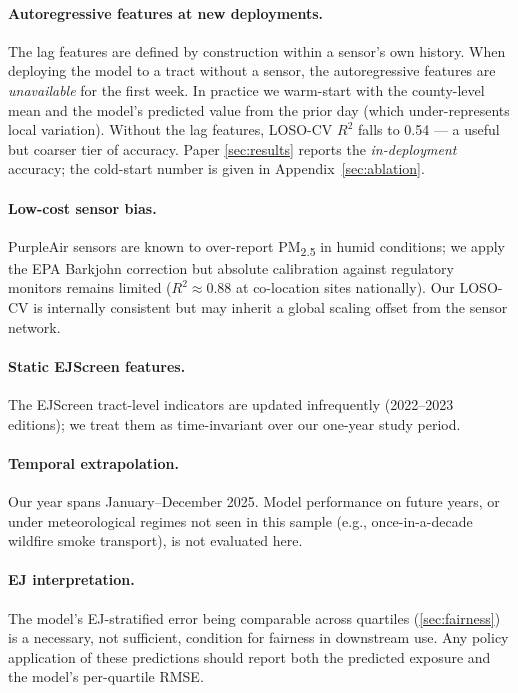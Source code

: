 \documentclass{article}
\begin{document}
\paragraph{Autoregressive features at new deployments.} The lag features are defined by construction within a sensor's own history. When deploying the model to a tract without a sensor, the autoregressive features are \emph{unavailable} for the first week. In practice we warm-start with the county-level mean and the model's predicted value from the prior day (which under-represents local variation). Without the lag features, LOSO-CV $R^2$ falls to 0.54 --- a useful but coarser tier of accuracy. Paper \autoref{sec:results} reports the \emph{in-deployment} accuracy; the cold-start number is given in Appendix~\ref{sec:ablation}.

\paragraph{Low-cost sensor bias.} PurpleAir sensors are known to over-report PM\textsubscript{2.5} in humid conditions; we apply the EPA Barkjohn correction \citep{barkjohn2021} but absolute calibration against regulatory monitors remains limited ($R^2 \approx 0.88$ at co-location sites nationally). Our LOSO-CV is internally consistent but may inherit a global scaling offset from the sensor network.

\paragraph{Static EJScreen features.} The EJScreen tract-level indicators are updated infrequently (\num{2022}--\num{2023} editions); we treat them as time-invariant over our one-year study period.

\paragraph{Temporal extrapolation.} Our year spans January--December 2025. Model performance on future years, or under meteorological regimes not seen in this sample (e.g., once-in-a-decade wildfire smoke transport), is not evaluated here.

\paragraph{EJ interpretation.} The model's EJ-stratified error being comparable across quartiles (\autoref{sec:fairness}) is a necessary, not sufficient, condition for fairness in downstream use. Any policy application of these predictions should report both the predicted exposure and the model's per-quartile RMSE.
\end{document}
